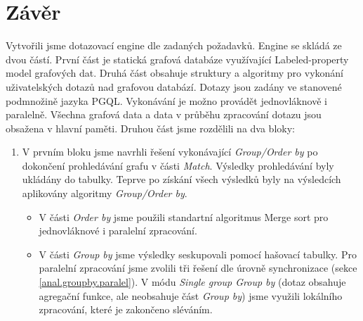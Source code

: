 \chapter*{Závěr}

Vytvořili jsme dotazovací engine dle zadaných požadavků.
Engine se skládá ze dvou částí.
První část je statická grafová databáze využívající Labeled-property model grafových dat. 
Druhá část obsahuje struktury a algoritmy pro vykonání uživatelských dotazů nad grafovou databází.
Dotazy jsou zadány ve stanovené podmnožině jazyka PGQL.
Vykonávání je možno provádět jednovláknově i paralelně.
Všechna grafová data a data v průběhu zpracování dotazu jsou obsažena v hlavní paměti.
Druhou část jsme rozdělili na dva bloky:
\begin{enumerate}
\item
V prvním bloku jsme navrhli řešení vykonávající \textit{Group/Order by} po dokončení prohledávání grafu v části \textit{Match}.
Výsledky prohledávání byly ukládány do tabulky.
Teprve po získání všech výsledků byly na výsledcích aplikovány algoritmy \textit{Group/Order by}.
\begin{itemize}
\item V části \textit{Order by} jsme použili standartní algoritmus Merge sort pro jednovláknové i paralelní zpracování.
\item V části \textit{Group by} jsme výsledky seskupovali pomocí hašovací tabulky.
Pro paralelní zpracování jsme zvolili tři řešení dle úrovně synchronizace (sekce \ref{anal.groupby.paralel}).
V módu \textit{Single group Group by} (dotaz obsahuje agregační funkce, ale neobsahuje část \textit{Group by}) jsme využili lokálního zpracování, které je zakončeno sléváním.
\end{itemize}


\end{enumerate}
